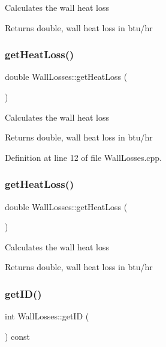 Calculates the wall heat loss \begin{DoxyReturn}{Returns}
double, wall heat loss in btu/hr 
\end{DoxyReturn}
\mbox{\label{class_wall_losses_a884da3507498878f619cbe5ba340c0ef}} 
\subsubsection{\texorpdfstring{get\+Heat\+Loss()}{getHeatLoss()}\hspace{0.1cm}{\footnotesize\ttfamily [2/3]}}
{\footnotesize\ttfamily double Wall\+Losses\+::get\+Heat\+Loss (\begin{DoxyParamCaption}{ }\end{DoxyParamCaption})}

Calculates the wall heat loss \begin{DoxyReturn}{Returns}
double, wall heat loss in btu/hr 
\end{DoxyReturn}


Definition at line 12 of file Wall\+Losses.\+cpp.

\mbox{\label{class_wall_losses_a884da3507498878f619cbe5ba340c0ef}} 
\subsubsection{\texorpdfstring{get\+Heat\+Loss()}{getHeatLoss()}\hspace{0.1cm}{\footnotesize\ttfamily [3/3]}}
{\footnotesize\ttfamily double Wall\+Losses\+::get\+Heat\+Loss (\begin{DoxyParamCaption}{ }\end{DoxyParamCaption})}

Calculates the wall heat loss \begin{DoxyReturn}{Returns}
double, wall heat loss in btu/hr 
\end{DoxyReturn}
\mbox{\label{class_wall_losses_ae764fa8917879d8c24df7582c159fec6}} 
\subsubsection{\texorpdfstring{get\+I\+D()}{getID()}\hspace{0.1cm}{\footnotesize\ttfamily [1/3]}}
{\footnotesize\ttfamily int Wall\+Losses\+::get\+ID (\begin{DoxyParamCaption}{ }\end{DoxyParamCaption}) const\hspace{0.3cm}{\ttfamily [inline]}}

